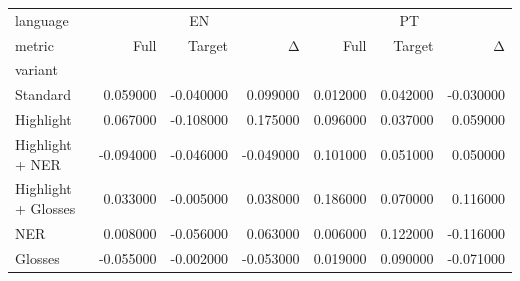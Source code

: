 \begin{tabular}{lrrrrrr}
\toprule
language & \multicolumn{3}{c}{EN} & \multicolumn{3}{c}{PT} \\
metric & Full & Target & Δ & Full & Target & Δ \\
variant &  &  &  &  &  &  \\
\midrule
Standard & 0.059000 & -0.040000 & 0.099000 & 0.012000 & 0.042000 & -0.030000 \\
Highlight & 0.067000 & -0.108000 & 0.175000 & 0.096000 & 0.037000 & 0.059000 \\
Highlight + NER & -0.094000 & -0.046000 & -0.049000 & 0.101000 & 0.051000 & 0.050000 \\
Highlight + Glosses & 0.033000 & -0.005000 & 0.038000 & 0.186000 & 0.070000 & 0.116000 \\
NER & 0.008000 & -0.056000 & 0.063000 & 0.006000 & 0.122000 & -0.116000 \\
Glosses & -0.055000 & -0.002000 & -0.053000 & 0.019000 & 0.090000 & -0.071000 \\
\bottomrule
\end{tabular}
